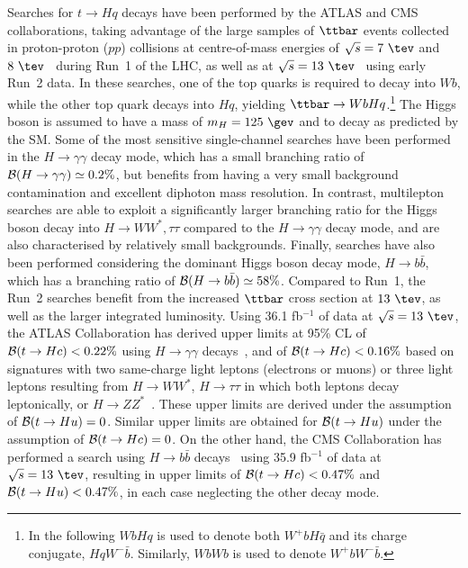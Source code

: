 Searches for $t \to Hq$ decays have been performed by the ATLAS and CMS collaborations, taking advantage of the large samples
of $\ttbar$ events collected in proton-proton ($pp$) collisions at centre-of-mass energies of $\sqrt{s}=7~\tev$ and $8~\tev$~\cite{Aad:2014dya,Aad:2015pja,Khachatryan:2016atv} during Run~1 of the LHC, as well as at $\sqrt{s}=13~\tev$~\cite{Aaboud:2017mfd,Aaboud:2018pob,Sirunyan:2017uae} using early Run~2 data.
In these searches, one of the top quarks is required to decay into $Wb$, while the other top quark decays into $Hq$, yielding $\ttbar \to WbHq$.\footnote{ 
In the following $WbHq$ is used to denote both $W^+b H\bar{q}$ and its charge conjugate, $HqW^- \bar{b}$. Similarly, 
$WbWb$ is used to denote $W^+b W^- \bar{b}$.}  The Higgs boson is assumed to have a mass of $m_H=125~\gev$ and to decay as predicted by
the SM. Some of the most sensitive single-channel searches have been performed in the $H\to\gamma\gamma$ decay mode, which
has a small branching ratio of $\mathcal{B}(H\to \gamma\gamma)\simeq 0.2\%$, but benefits from having a very small background contamination 
and excellent diphoton mass re\-so\-lu\-tion. In contrast, multilepton searches are able to exploit a significantly larger branching ratio for the Higgs 
boson decay into $H \to WW^*, \tau\tau$ compared to the $H\to\gamma\gamma$ decay mode, and are also characterised by relatively small backgrounds.
Finally, searches have also been performed considering the dominant Higgs boson decay mode, $H\to b\bar{b}$, which has a branching ratio 
of $\mathcal{B}(H\to b\bar{b})\simeq 58\%$. Compared to Run~1, the Run~2 searches benefit from the increased $\ttbar$ cross section at $13~\tev$, 
as well as the larger integrated luminosity.
Using 36.1 fb$^{-1}$ of data at $\sqrt{s}=13~\tev$, the ATLAS Collaboration has derived upper limits at 95\% CL of  
$\mathcal{B}(t\to Hc)<0.22\%$ using $H\to \gamma\gamma$ decays~\cite{Aaboud:2017mfd}, and of $\mathcal{B}(t\to Hc)<0.16\%$ based on
signatures with two same-charge light leptons (electrons or muons) or three light leptons resulting from 
$H \to WW^*$, $H\to \tau\tau$ in which both leptons decay leptonically, or $H \to ZZ^*$~\cite{Aaboud:2018pob}.
These upper limits are derived under the assumption of $\mathcal{B}(t\to Hu)=0$. Similar upper limits are obtained for $\mathcal{B}(t\to Hu)$ under the
assumption of $\mathcal{B}(t\to Hc)=0$. On the other hand, the CMS Collaboration has performed a search using  
$H\to b\bar{b}$ decays~\cite{Sirunyan:2017uae} using 35.9 fb$^{-1}$ of data at $\sqrt{s}=13~\tev$, resulting 
in upper limits of $\mathcal{B}(t\to Hc)<0.47\%$ and $\mathcal{B}(t\to Hu)<0.47\%$, in each case neglecting the other decay mode.

